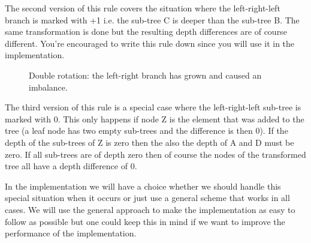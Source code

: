 \documentclass[a4paper,11pt]{article}
\begin{document}
The second version of this rule covers the situation where the
left-right-left branch is marked with +1 i.e. the sub-tree C is deeper
than the sub-tree B. The same transformation is done but the resulting
depth differences are of course different. You're encouraged to write
this rule down since you will use it in the implementation. 

\begin{figure}
 

\caption{Double rotation: the left-right branch has grown and caused an imbalance. \label{fig:double}}
\end{figure}

The third version of this rule is a special case where the
left-right-left sub-tree is marked with 0. This only happens if node Z
is the element that was added to the tree (a leaf node has two empty
sub-trees and the difference is then 0). If the depth of the sub-trees
of Z is zero then the also the depth of A and D must be zero. If all
sub-trees are of depth zero then of course the nodes of the
transformed tree all have a depth difference of 0.

In the implementation we will have a choice whether we should handle
this special situation when it occurs or just use a general scheme
that works in all cases. We will use the general approach to make the
implementation as easy to follow as possible but one could keep this
in mind if we want to improve the performance of the implementation.
\end{document}
